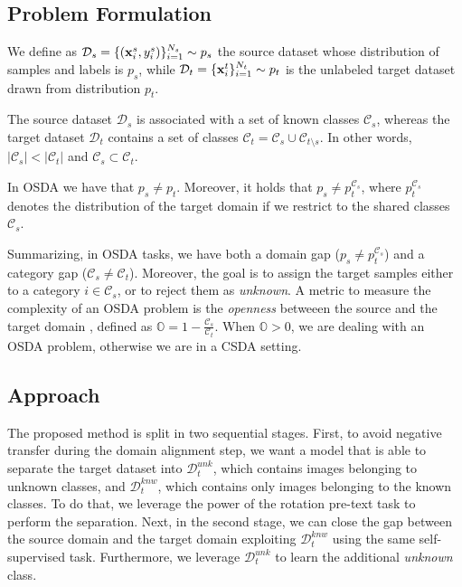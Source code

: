 \documentclass[10pt,twocolumn,letterpaper]{article}
\begin{document}
\subsection{Problem Formulation}
\label{sec:problemformulation}
We define as $\mathcal{D}_s = \{({\bf x}_i^s, y_i^s)\}_{i=1}^{N_s} \sim p_s$ the source dataset whose distribution of samples and labels is $p_s$,
while $\mathcal{D}_t = \{{\bf x}_i^t\}_{i=1}^{N_t} \sim p_t$ is the unlabeled target dataset drawn from distribution $p_t$. 

The source dataset $\mathcal{D}_s$ is associated with a set of known classes $\mathcal{C}_s$,
whereas the target dataset $\mathcal{D}_t$ contains a set of classes $\mathcal{C}_t = \mathcal{C}_s \cup \mathcal{C}_{t \setminus s}$.
In other words,
$|\mathcal{C}_s| < |\mathcal{C}_t|$ and $\mathcal{C}_s \subset \mathcal{C}_t$. 

In OSDA we have that $p_s \neq p_t$.
Moreover, it holds that $p_s \neq p_t^{\mathcal{C}_s}$, where $p_t^{\mathcal{C}_s}$ denotes the distribution of the target domain if we restrict to
the shared classes $\mathcal{C}_s$. 

Summarizing, in OSDA tasks, we have both a domain gap ($p_s \neq p_t^{\mathcal{C}_s}$)
and a category gap ($\mathcal{C}_s \neq \mathcal{C}_t$). Moreover, the goal is to assign the target samples either to a category ${i \in \mathcal{C}_s}$,
or to reject them as {\it unknown}.
A metric to measure the complexity of an OSDA problem is the {\it openness} betweeen the source and the target domain \cite{bendale2015open}, 
defined as $\displaystyle \mathbb{O} = 1-\frac{\mathcal{C}_s}{\mathcal{C}_t}$.
When $\mathbb{O} > 0$, we are dealing with an OSDA problem, otherwise we are in a CSDA setting.

\subsection{Approach}
\label{sec:apporach}
The proposed method is split in two sequential stages. First, to avoid negative transfer during the domain alignment step, we want a model
that is able to separate the target dataset into $\mathcal{D}_t^{unk}$, which contains images belonging to unknown classes,
and $\mathcal{D}_t^{knw}$, which contains only images belonging to the known classes. To do that, we leverage the
power of the rotation pre-text task to perform the separation.
Next, in the second stage, we can close the gap between the source domain and the target domain exploiting $\mathcal{D}_t^{knw}$
using the same self-supervised task. Furthermore, we leverage $\mathcal{D}_t^{unk}$ to learn the additional {\it unknown} class.
\end{document}
